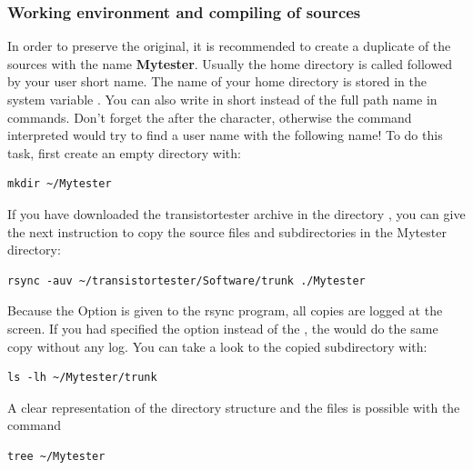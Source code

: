 \subsubsection{Working environment and compiling of sources}
\label{sec:Arbeitsumgebung}
In order to preserve the original, it is recommended to create a duplicate
of the sources with the name \textbf{Mytester}.
Usually the home directory is called  followed by your user short name.
The name of your home directory is stored in the system variable .
You can also write \lname{\textasciitilde/} in short instead of the full path name in commands. 
Don't forget the \lname{/} after the \lname{\textasciitilde} character, otherwise the command
interpreted would try to find a user name with the following name!
To do this task, first create an empty directory with: 
\begin{large} \vspace{-0.4em} \begin{verbatim}
mkdir ~/Mytester
\end{verbatim} \end{large}
If you have downloaded the transistortester archive in the directory ,
you can give the next instruction to copy the source files and subdirectories
in the Mytester directory:
\begin{large} \vspace{-0.4em} \begin{verbatim}
rsync -auv ~/transistortester/Software/trunk ./Mytester
\end{verbatim} \end{large}
Because the  Option is given to the rsync program, all
copies are logged at the screen.
If you had specified the  option instead of the ,
the  would do the same copy without any log.
You can take a look to the copied subdirectory with:
\begin{large} \vspace{-0.4em} \begin{verbatim}
ls -lh ~/Mytester/trunk
\end{verbatim} \end{large}
A clear representation of the directory structure and the files is possible with the command
\begin{large} \vspace{-0.4em} \begin{verbatim}
tree ~/Mytester
\end{verbatim} \end{large}
